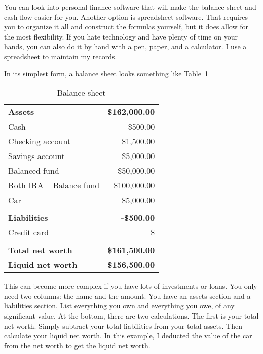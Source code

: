 You can look into personal finance software that will make the balance sheet and cash flow easier for you. Another option is spreadsheet software. That requires you to organize it all and construct the formulas yourself, but it does allow for the most flexibility. If you hate technology and have plenty of time on your hands, you can also do it by hand with a pen, paper, and a calculator. I use a spreadsheet to maintain my records.

In its simplest form, a balance sheet looks something like Table~\ref{tab:balance-sheet}

\begin{table}[ht]
\caption{Balance sheet}
\label{tab:balance-sheet}
\centering
\begin{tabular}{l r}
\\\hline
\\\hline
\textbf{Assets} & \textbf{\$162,000.00}\\
\hline
Cash & \$500.00\\
Checking account & \$1,500.00\\
Savings account & \$5,000.00\\
Balanced fund & \$50,000.00\\
Roth IRA -- Balance fund & \$100,000.00\\
Car & \$5,000.00\\
\\
\textbf{Liabilities} & {\color{red} \textbf{-\$500.00}}\\
\hline
Credit card & {\color{red} \$\-500.00}\\
\\
\textbf{Total net worth} & \textbf{\$161,500.00}\\
\textbf{Liquid net worth} & \textbf{\$156,500.00}\\
\end{tabular}
\end{table}

This can become more complex if you have lots of investments or loans. You only need two columns: the name and the amount. You have an assets section and a liabilities section. List everything you own and everything you owe, of any significant value. At the bottom, there are two calculations. The first is your total net worth. Simply subtract your total liabilities from your total assets. Then calculate your liquid net worth. In this example, I deducted the value of the car from the net worth to get the liquid net worth.


